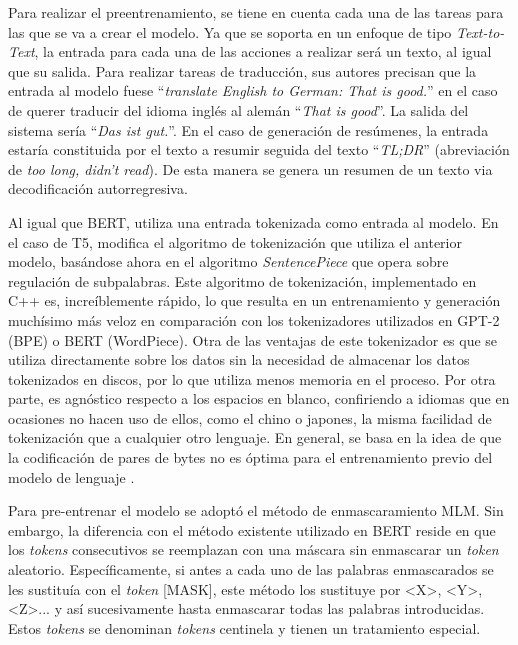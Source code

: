 Para realizar el preentrenamiento, se tiene en cuenta cada una de las tareas para las que se va a crear el modelo. Ya que se soporta en un enfoque de tipo \textit{Text-to-Text}, la entrada para cada una de las acciones a realizar será un texto, al igual que su salida. Para realizar tareas de traducción, sus autores precisan que la entrada al modelo fuese ``\textit{translate English to German: That is
good.}'' en el caso de querer traducir del idioma inglés al alemán ``\textit{That is
good}''. La salida del sistema sería ``\textit{Das ist gut.}''. En el caso de generación de resúmenes, la entrada estaría constituida por el texto a resumir seguida del texto ``\textit{TL;DR}'' (abreviación de \textit{too long, didn't read}). De esta manera se genera un resumen de un texto via decodificación autorregresiva. 

Al igual que BERT, utiliza una entrada tokenizada como entrada al modelo. En el caso de T5, modifica el algoritmo de tokenización que utiliza el anterior modelo, basándose ahora en el algoritmo \textit{SentencePiece} que opera sobre regulación de subpalabras. Este algoritmo de tokenización, implementado en C++ es, increíblemente rápido, lo que resulta en un entrenamiento y generación muchísimo más veloz en comparación con los tokenizadores utilizados en GPT-2 (BPE) o BERT (WordPiece). Otra de las ventajas de este tokenizador es que se utiliza directamente sobre los datos sin la necesidad de almacenar los datos tokenizados en discos, por lo que utiliza menos memoria en el proceso. Por otra parte, es agnóstico respecto a los espacios en blanco, confiriendo a idiomas que en ocasiones no hacen uso de ellos, como el chino o japones, la misma facilidad de tokenización que a cualquier otro lenguaje. En general, se basa en la idea de que la codificación de pares de bytes no es óptima para el entrenamiento previo del modelo de lenguaje \citep{bostrom-durrett-2020-byte}.

Para pre-entrenar el modelo se adoptó el método de enmascaramiento MLM. Sin embargo, la diferencia con el método existente utilizado en BERT reside en que los \textit{tokens} consecutivos se reemplazan con una máscara sin enmascarar un \textit{token} aleatorio. Específicamente, si antes a cada uno de las palabras enmascarados se les sustituía con el \textit{token} [MASK], este método los sustituye por <X>, <Y>, <Z>... y así sucesivamente hasta enmascarar todas las palabras introducidas. Estos \textit{tokens} se denominan \textit{tokens} centinela y tienen un tratamiento especial.


